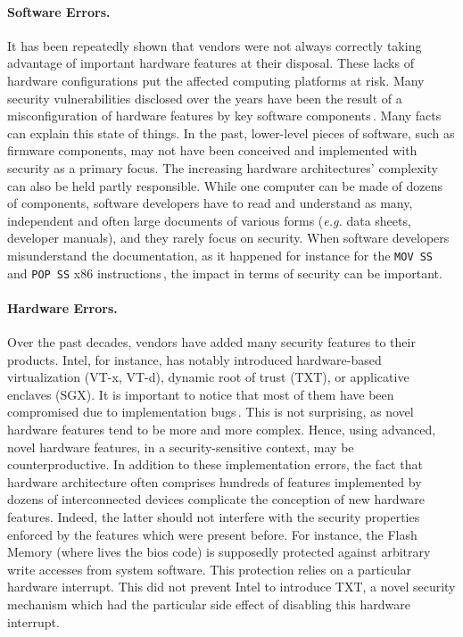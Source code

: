 \paragraph{Software Errors.}
%
It has been repeatedly shown that vendors were not always correctly taking
advantage of important hardware features at their disposal.
%
These lacks of hardware configurations put the affected computing platforms at
risk.
%
Many security vulnerabilities disclosed over the years have been the result of a
misconfiguration of hardware features by key software
components\,\cite{bulygin2014bios}.
%
Many facts can explain this state of things.
%
In the past, lower-level pieces of software, such as firmware components, may
not have been conceived and implemented with security as a primary focus.
%
The increasing hardware architectures' complexity can also be held partly
responsible.
%
While one computer can be made of dozens of components, software developers have
to read and understand as many, independent and often large documents of various
forms (\emph{e.g.} data sheets, developer manuals), and they rarely focus on
security.
%
When software developers misunderstand the documentation, as it happened for
instance for the \texttt{MOV SS} and \texttt{POP SS} x86
instructions\,\cite{movsspopss}, the impact in terms of security can be
important.

\paragraph{Hardware Errors.}
%
Over the past decades, vendors have added many security features to their
products.
%
Intel, for instance, has notably introduced hardware-based virtualization (VT-x,
VT-d), dynamic root of trust (TXT), or applicative enclaves (SGX).
%
It is important to notice that most of them have been compromised due to
implementation bugs\,\cite{wojtczuk2011txtbug,sang2010iommu}.
%
This is not surprising, as novel hardware features tend to be more and more
complex.
%
Hence, using advanced, novel hardware features, in a security-sensitive context,
may be counterproductive.
%
In addition to these implementation errors, the fact that hardware architecture
often comprises hundreds of features implemented by dozens of interconnected
devices complicate the conception of new hardware features.
%
Indeed, the latter should not interfere with the security properties enforced by
the features which were present before.
%
For instance, the Flash Memory (where lives the \ac{bios} code) is supposedly
protected against arbitrary write accesses from system software.
%
This protection relies on a particular hardware interrupt.
%
This did not prevent Intel to introduce TXT, a novel security mechanism which
had the particular side effect of disabling this hardware interrupt.

